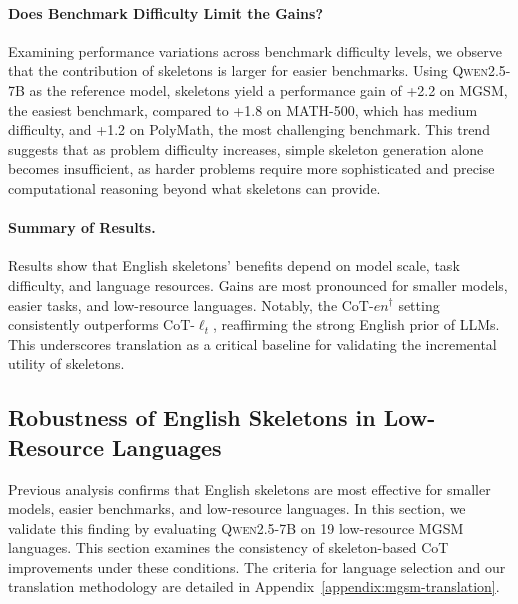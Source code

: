 \paragraph{Does Benchmark Difficulty Limit the Gains?}
Examining performance variations across benchmark difficulty levels, we observe that the contribution of skeletons is larger for easier benchmarks. Using \textsc{Qwen2.5-7B} as the reference model, skeletons yield a performance gain of +2.2 on MGSM, the easiest benchmark, compared to +1.8 on MATH-500, which has medium difficulty, and +1.2 on PolyMath, the most challenging benchmark. This trend suggests that as problem difficulty increases, simple skeleton generation alone becomes insufficient, as harder problems require more sophisticated and precise computational reasoning beyond what skeletons can provide.

\paragraph{Summary of Results.}
Results show that English skeletons' benefits depend on model scale, task difficulty, and language resources. Gains are most pronounced for smaller models, easier tasks, and low-resource languages. Notably, the CoT-\textsc{$en^{\dagger}$} setting consistently outperforms CoT\textsc{-$\ell_t$}, reaffirming the strong English prior of LLMs. This underscores translation as a critical baseline for validating the incremental utility of skeletons.

\subsection{Robustness of English Skeletons in Low-Resource Languages} \label{sec:robust_lowresource}

Previous analysis confirms that English skeletons are most effective for smaller models, easier benchmarks, and low-resource languages. In this section, we validate this finding by evaluating \textsc{Qwen2.5-7B} on 19 low-resource MGSM languages. This section examines the consistency of skeleton-based CoT improvements under these conditions. The criteria for language selection and our translation methodology are detailed in Appendix~\ref{appendix:mgsm-translation}.

